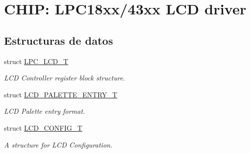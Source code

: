 \hypertarget{group___l_c_d__18_x_x__43_x_x}{}\section{C\+H\+IP\+: L\+P\+C18xx/43xx L\+CD driver}
\label{group___l_c_d__18_x_x__43_x_x}
\subsection*{Estructuras de datos}
\begin{DoxyCompactItemize}
\item 
struct \hyperlink{struct_l_p_c___l_c_d___t}{L\+P\+C\+\_\+\+L\+C\+D\+\_\+T}
\begin{DoxyCompactList}\small\item\em L\+CD Controller register block structure. \end{DoxyCompactList}\item 
struct \hyperlink{struct_l_c_d___p_a_l_e_t_t_e___e_n_t_r_y___t}{L\+C\+D\+\_\+\+P\+A\+L\+E\+T\+T\+E\+\_\+\+E\+N\+T\+R\+Y\+\_\+T}
\begin{DoxyCompactList}\small\item\em L\+CD Palette entry format. \end{DoxyCompactList}\item 
struct \hyperlink{struct_l_c_d___c_o_n_f_i_g___t}{L\+C\+D\+\_\+\+C\+O\+N\+F\+I\+G\+\_\+T}
\begin{DoxyCompactList}\small\item\em A structure for L\+CD Configuration. \end{DoxyCompactList}\end{DoxyCompactItemize}

